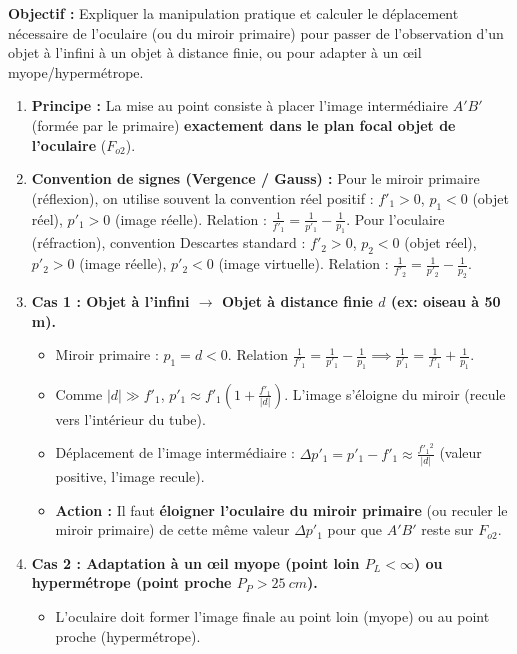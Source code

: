 \documentclass[11pt]{article}
\begin{document}
\begin{methode}
\textbf{Objectif :} Expliquer la manipulation pratique et calculer le déplacement nécessaire de l'oculaire (ou du miroir primaire) pour passer de l'observation d'un objet à l'infini à un objet à distance finie, ou pour adapter à un œil myope/hypermétrope.
\begin{enumerate}
    \item \textbf{Principe :} La mise au point consiste à placer l'image intermédiaire $A'B'$ (formée par le primaire) \textbf{exactement dans le plan focal objet de l'oculaire} ($F_{o2}$).
    \item \textbf{Convention de signes (Vergence / Gauss) :} Pour le miroir primaire (réflexion), on utilise souvent la convention \og réel positif \fg : $f'_1>0$, $p_1<0$ (objet réel), $p'_1>0$ (image réelle). Relation : $\frac{1}{f'_1} = \frac{1}{p'_1} - \frac{1}{p_1}$. Pour l'oculaire (réfraction), convention Descartes standard : $f'_2>0$, $p_2<0$ (objet réel), $p'_2>0$ (image réelle), $p'_2<0$ (image virtuelle). Relation : $\frac{1}{f'_2} = \frac{1}{p'_2} - \frac{1}{p_2}$.
    \item \textbf{Cas 1 : Objet à l'infini $\rightarrow$ Objet à distance finie $d$ (ex: oiseau à 50 m).}
    \begin{itemize}
        \item Miroir primaire : $p_1 = d < 0$. Relation $\frac{1}{f'_1} = \frac{1}{p'_1} - \frac{1}{p_1} \implies \frac{1}{p'_1} = \frac{1}{f'_1} + \frac{1}{p_1}$.
        \item Comme $|d| \gg f'_1$, $p'_1 \approx f'_1 \left(1 + \frac{f'_1}{|d|}\right)$. L'image s'éloigne du miroir (recule vers l'intérieur du tube).
        \item Déplacement de l'image intermédiaire : $\Delta p'_1 = p'_1 - f'_1 \approx \frac{f'_1{}^2}{|d|}$ (valeur positive, l'image recule).
        \item \textbf{Action :} Il faut \textbf{éloigner l'oculaire du miroir primaire} (ou reculer le miroir primaire) de cette même valeur $\Delta p'_1$ pour que $A'B'$ reste sur $F_{o2}$.
    \end{itemize}
    \item \textbf{Cas 2 : Adaptation à un œil myope (point loin $P_L < \infty$) ou hypermétrope (point proche $P_P > \SI{25}{cm}$).}
    \begin{itemize}
        \item L'oculaire doit former l'image finale au point loin (myope) ou au point proche (hypermétrope).

\end{itemize}
\end{enumerate}
\end{methode}
\end{document}

